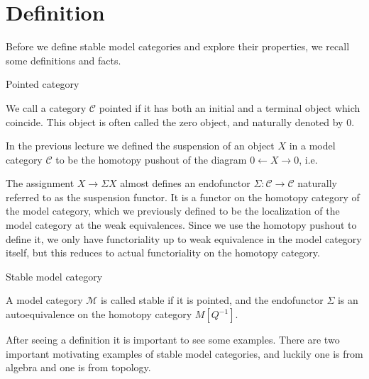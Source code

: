 

\section{Definition}

Before we define stable model categories and explore their properties, 
we recall some definitions and facts. 

\begin{definition}{Pointed category}

We call a category $\mathcal{C}$ pointed if it has both an initial and a terminal object which coincide. 
This object is often called the zero object, 
and naturally denoted by $0$. 
\end{definition}

In the previous lecture we defined the suspension of an object $X$ in a model category $\mathcal{C}$ to be the homotopy pushout of the diagram $0\longleftarrow X \longrightarrow 0$, 
i.e. 
\begin{center}
\end{center}

The assignment $X\longrightarrow \Sigma X$ almost defines an endofunctor $\Sigma : \mathcal{C}\longrightarrow \mathcal{C}$ naturally referred to as the suspension functor. 
It is a functor on the homotopy category of the model category, 
which we previously defined to be the localization of the model category at the weak equivalences. 
Since we use the homotopy pushout to define it, 
we only have functoriality up to weak equivalence in the model category itself, 
but this reduces to actual functoriality on the homotopy category. 

\begin{definition}{Stable model category}

A model category $\mathcal{M}$ is called stable if it is pointed, 
and the endofunctor $\Sigma$ is an autoequivalence on the homotopy category $M[Q^{-1}]$. 
\end{definition}

After seeing a definition it is important to see some examples. 
There are two important motivating examples of stable model categories, 
and luckily one is from algebra and one is from topology. 

